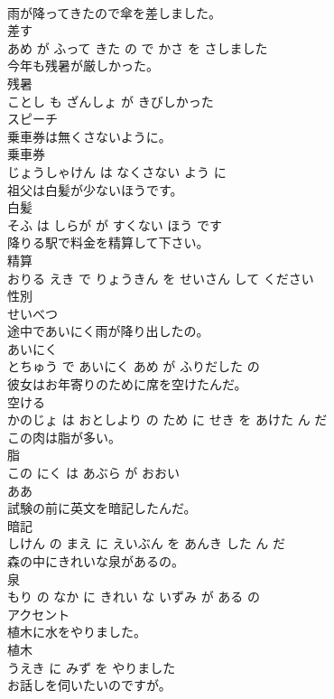 \documentclass[8pt]{extreport}
\begin{document}
\begin{CJK}{UTF8}{min}
\\	雨が降ってきたので傘を差しました。	
\\	差す 
\\	あめ が ふって きた の で かさ を さしました			
\\	今年も残暑が厳しかった。	
\\	残暑 
\\	ことし も ざんしょ が きびしかった			
\\	スピーチ	
\\	乗車券は無くさないように。	
\\	乗車券 
\\	じょうしゃけん は なくさない よう に			
\\	祖父は白髪が少ないほうです。	
\\	白髪 
\\	そふ は しらが が すくない ほう です			
\\	降りる駅で料金を精算して下さい。	
\\	精算 
\\	おりる えき で りょうきん を せいさん して ください			
\\	性別	
\\	せいべつ		
\\	途中であいにく雨が降り出したの。	
\\	あいにく 
\\	とちゅう で あいにく あめ が ふりだした の			
\\	彼女はお年寄りのために席を空けたんだ。	
\\	空ける 
\\	かのじょ は おとしより の ため に せき を あけた ん だ			
\\	この肉は脂が多い。	
\\	脂 
\\	この にく は あぶら が おおい			
\\	ああ	
\\	試験の前に英文を暗記したんだ。	
\\	暗記 
\\	しけん の まえ に えいぶん を あんき した ん だ			
\\	森の中にきれいな泉があるの。	
\\	泉 
\\	もり の なか に きれい な いずみ が ある の			
\\	アクセント	
\\	植木に水をやりました。	
\\	植木 
\\	うえき に みず を やりました			
\\	お話しを伺いたいのですが。	

\end{CJK}
\end{document}
